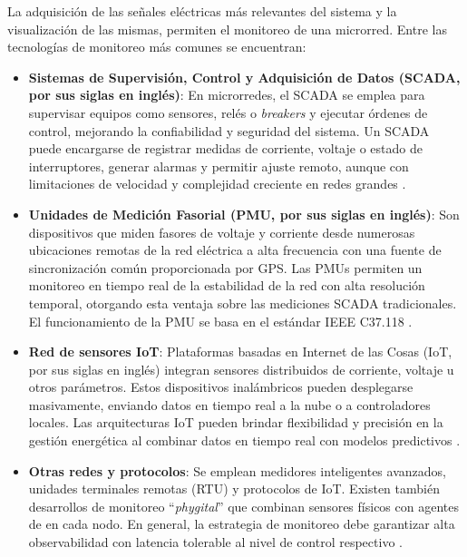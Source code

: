 La adquisición de las señales eléctricas más relevantes del sistema y la visualización de las mismas, permiten el monitoreo de una microrred. Entre las tecnologías de monitoreo más comunes se encuentran:
\begin{itemize}
    \item \textbf{Sistemas de Supervisión, Control y Adquisición de Datos (SCADA, por sus siglas en inglés)}: En microrredes, el SCADA se emplea para supervisar equipos como sensores, relés o \textit{breakers} y ejecutar órdenes de control, mejorando la confiabilidad y seguridad del sistema. Un SCADA puede encargarse de registrar medidas de corriente, voltaje o estado de interruptores, generar alarmas y permitir ajuste remoto, aunque con limitaciones de velocidad y complejidad creciente en redes grandes \cite{li2017_scada_microgrid}.
    \item \textbf{Unidades de Medición Fasorial (PMU, por sus siglas en inglés)}: Son dispositivos que miden fasores de voltaje y corriente desde numerosas ubicaciones remotas de la red eléctrica a alta frecuencia con una fuente de sincronización común proporcionada por GPS. Las PMUs permiten un monitoreo en tiempo real de la estabilidad de la red con alta resolución temporal, otorgando esta ventaja sobre las mediciones SCADA tradicionales. El funcionamiento de la PMU se basa en el estándar IEEE C37.118 \cite{8975460_PMU_microgrid}.
    \item \textbf{Red de sensores IoT}: Plataformas basadas en Internet de las Cosas (IoT, por sus siglas en inglés) integran sensores distribuidos de corriente, voltaje u otros parámetros. Estos dispositivos inalámbricos pueden desplegarse masivamente, enviando datos en tiempo real a la nube o a controladores locales.  Las arquitecturas IoT pueden brindar flexibilidad y precisión en la gestión energética al combinar datos en tiempo real con modelos predictivos \cite{2025106158_iot_microgrid}.
    \item \textbf{Otras redes y protocolos}: Se emplean medidores inteligentes avanzados, unidades terminales remotas (RTU) y protocolos de IoT. Existen también desarrollos de monitoreo ``\textit{phygital}'' que combinan sensores físicos con agentes de  en cada nodo. En general, la estrategia de monitoreo debe garantizar alta observabilidad con latencia tolerable al nivel de control respectivo \cite{9023471_communication_microgrid}.
\end{itemize}

